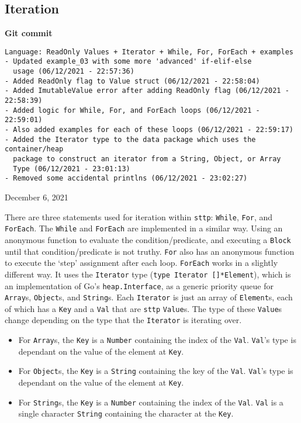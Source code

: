 \subsection{Iteration}

\begin{center}
    \textbf{Git commit}
    \begin{verbatim}
Language: ReadOnly Values + Iterator + While, For, ForEach + examples
- Updated example_03 with some more 'advanced' if-elif-else 
  usage (06/12/2021 - 22:57:36)
- Added ReadOnly flag to Value struct (06/12/2021 - 22:58:04)
- Added ImutableValue error after adding ReadOnly flag (06/12/2021 - 22:58:39)
- Added logic for While, For, and ForEach loops (06/12/2021 - 22:59:01)
- Also added examples for each of these loops (06/12/2021 - 22:59:17)
- Added the Iterator type to the data package which uses the container/heap
  package to construct an iterator from a String, Object, or Array
  Type (06/12/2021 - 23:01:13)
- Removed some accidental printlns (06/12/2021 - 23:02:27)
    \end{verbatim}
    \vspace{-1em}
    \tiny{December 6, 2021}
\end{center}

There are three statements used for iteration within \verb|sttp|: \verb|While|, \verb|For|, and \verb|ForEach|. The \verb|While| and \verb|ForEach| are implemented in a similar way. Using an anonymous function to evaluate the condition/predicate, and executing a \verb|Block| until that condition/predicate is not truthy. \verb|For| also has an anonymous function to execute the `step' assignment after each loop. \verb|ForEach| works in a slightly different way. It uses the \verb|Iterator| type (\texttt{type Iterator []*Element}), which is an implementation of Go's \verb|heap.Interface|, as a generic priority queue for \verb|Array|s, \verb|Object|s, and \verb|String|s. Each \verb|Iterator| is just an array of \verb|Element|s, each of which has a \verb|Key| and a \verb|Val| that are \verb|sttp| \verb|Value|s. The type of these \verb|Value|s change depending on the type that the \verb|Iterator| is iterating over.

\begin{itemize}
    \item For \verb|Array|s, the \verb|Key| is a \verb|Number| containing the index of the \verb|Val|. \verb|Val|'s type is dependant on the value of the element at \verb|Key|.
    \item For \verb|Object|s, the \verb|Key| is a \verb|String| containing the key of the \verb|Val|. \verb|Val|'s type is dependant on the value of the element at \verb|Key|.
    \item For \verb|String|s, the \verb|Key| is a \verb|Number| containing the index of the \verb|Val|. \verb|Val| is a single character \verb|String| containing the character at the \verb|Key|.
\end{itemize}

